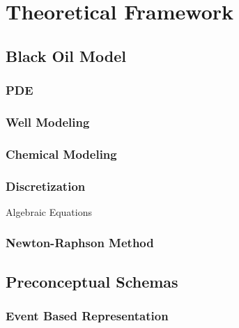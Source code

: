 

\chapter{Theoretical Framework}
%
\section{Black Oil Model}
\subsection{PDE}
%
\subsection{Well Modeling}
%
\subsection{Chemical Modeling}
%
\subsection{Discretization}
Algebraic Equations

\subsection{Newton-Raphson Method}
%

\section{Preconceptual Schemas}

\subsection{Event Based Representation}
%